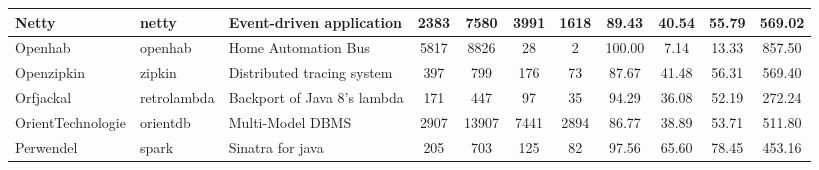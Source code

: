\begin{table*}[]
{\begin{tabular}{lllcccccccc}
Netty                       & netty                                                         & Event-driven application                                                  & 2383           & 7580            & 3991                                                                  & 1618           & 89.43          & 40.54          & 55.79          & 569.02                                               \\ \hline
Openhab                     & openhab                                                       & Home Automation Bus                                                       & 5817           & 8826            & 28                                                                    & 2              & 100.00         & 7.14           & 13.33          & 857.50                                               \\ \hline
Openzipkin                  & zipkin                                                        & Distributed tracing system                                                & 397            & 799             & 176                                                                   & 73             & 87.67          & 41.48          & 56.31          & 569.40                                               \\ \hline
Orfjackal                   & retrolambda                                                   & Backport of Java 8's lambda                                               & 171            & 447             & 97                                                                    & 35             & 94.29          & 36.08          & 52.19          & 272.24                                               \\ \hline
OrientTechnologie           & orientdb                                                      & Multi-Model DBMS                                                          & 2907           & 13907           & 7441                                                                  & 2894           & 86.77          & 38.89          & 53.71          & 511.80                                               \\ \hline
Perwendel                   & spark                                                         & Sinatra  for java                                                         & 205            & 703             & 125                                                                   & 82             & 97.56          & 65.60          & 78.45          & 453.16                                               \\ \hline

\end{tabular}}
\end{table*}
